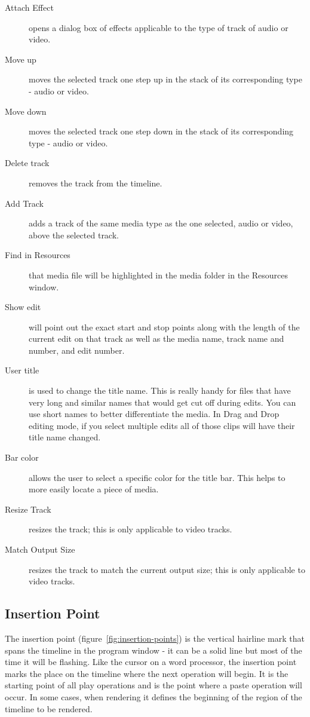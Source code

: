 \begin{description}
    \item[Attach Effect] opens a dialog box of effects applicable to the type of track of audio or video.
    \item[Move up] moves the selected track one step up in the stack of its corresponding type - audio or video.
    \item[Move down]  moves the selected track one step down in the stack of its corresponding type - audio or video.
    \item[Delete track]  removes the track from the timeline.
    \item[Add Track]  adds a track of the same media type as the one selected, audio or video, above the selected track.
    \item[Find in Resources]  that media file will be highlighted in the media folder in the Resources window.
    \item[Show edit]  will point out the exact start and stop points along with the length of the current edit on
        that track as well as the media name, track name and number, and edit number.
    \item[User title]  is used to change the title name.  This is really handy for files that have very long and
        similar names that would get cut off during edits.  You can use short names to better differentiate the
        media. In Drag and Drop editing mode, if you select multiple edits all of those clips will have
their title name changed.
    \item[Bar color]  allows the user to select a specific color for the title bar.  This helps to more easily locate a piece of media.
    \item[Resize Track]  resizes the track; this is only applicable to video tracks.
    \item[Match Output Size]  resizes the track to match the current output size; this is only applicable to video tracks.
\end{description}


\subsection{Insertion Point}%
\label{sub:insertion_point}

The insertion point (figure~\ref{fig:insertion-points}) is the vertical hairline mark that spans the timeline in the program window - it can be a solid line but most of the time it will be flashing. 
Like the cursor on a word processor, the insertion point marks the place on the timeline where the next
operation will begin. It is the starting point of all play operations and is the point where a paste operation will occur. 
In some cases, when rendering it defines the beginning of the region of the timeline to be rendered. 


